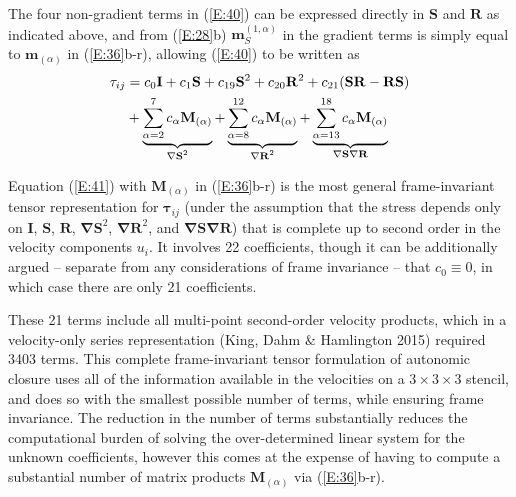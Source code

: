 The four non-gradient terms in (\ref{E:40}) can be expressed directly in $\mathbf{S}$ and $\mathbf{R}$ as indicated above, and from (\ref{E:28}b)  $\mathbf{m}^{(1,\alpha)}_{S}$ in the gradient terms is simply equal to $\mathbf{m}_{(\alpha)}$ in (\ref{E:36}b-r), allowing (\ref{E:40}) to be written as
%
\begin{align}
\label{E:42}
	\mathbf{\tau}_{ij} &=  c_{0} \mathbf{I}
	+ c_{1} \mathbf{S}
	+ c_{19} \mathbf{S}^2
	+ c_{20} \mathbf{R}^2
	+ c_{21} (\mathbf{SR-RS}) \notag \\
	&+ \underbrace{
				\sum_{\alpha=2}^{7} c_{\alpha} \mathbf{M}_{(\alpha)}
				 } %
				_{\text{ $\mathbf{\nabla S}^2$ }}
	+ \underbrace{
				\sum_{\alpha=8}^{12} c_{\alpha} \mathbf{M}_{(\alpha)}
				 } %
				_{\text{ $\mathbf{\nabla R}^2$ }}
	+ \underbrace{
				\sum_{\alpha=13}^{18} c_{\alpha} \mathbf{M}_{(\alpha)}
				 } %
				_{\text{ $\mathbf{\nabla S \nabla R}$ }}
\end{align}
%
%   

Equation (\ref{E:41}) with $\mathbf{M}_{(\alpha)}$  in (\ref{E:36}b-r) is the most general frame-invariant tensor representation for $\mathbf{\tau}_{ij}$  (under the assumption that the stress depends only on $\mathbf{I}$, $\mathbf{S}$, $\mathbf{R}$, $\mathbf{\nabla S}^{2}$, $\mathbf{\nabla R}^{2}$, and $\mathbf{\nabla S \nabla R}$) that is complete up to second order in the velocity components  $u_i$.  It involves 22 coefficients, though it can be additionally argued – separate from any considerations of frame invariance – that $c_0 \equiv 0$, in which case there are only 21 coefficients. 



These 21 terms include all multi-point second-order velocity products, which in a velocity-only  series representation (King, Dahm $\&$ Hamlington 2015) required 3403 terms. This complete frame-invariant tensor formulation of autonomic closure uses all of the information available in the velocities on a $3 \times 3 \times 3$  stencil, and does so with the smallest possible number of terms, while ensuring frame invariance. The reduction in the number of terms substantially reduces the computational burden of solving the over-determined linear system for the unknown coefficients, however this comes at the expense of having to compute a substantial number of matrix products $\mathbf{M}_{(\alpha)}$  via (\ref{E:36}b-r).

